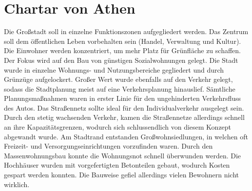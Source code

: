 \documentclass[12pt,a4paper]{report}
\newenvironment{gblock}[1]{
    \tcolorbox[beamer,
        noparskip,breakable,
        colback=green!50!,
        colbacklower=green!75!green,
        title=#1]}
{\endtcolorbox}
\begin{document}
	\bsremovechaptertitle
	\chapter{Chartar von Athen}
	\begin{gblock}{Leitbild nach Le Corbusiers (funktionale Stadt)}
	Die Großstadt soll in einzelne Funktionszonen aufgegliedert werden.
	Das Zentrum soll dem öffentlichen Leben vorbehalten sein (Handel, Verwaltung und Kultur). Die Einwohner werden konzentriert, um mehr Platz für Grünfläche zu schaffen.
	\end{gblock}
	\vspace{1cm}
	\begin{gblock}{Die gegliederte und autogerechte Stadt}
		Der Fokus wird auf den Bau von günstigen Sozialwohnungen gelegt.
		Die Stadt wurde in einzelne Wohnungs- und Nutzungsbereiche gegliedert und durch Grünzüge aufgelockert.
		Großer Wert wurde ebenfalls auf den Verkehr gelegt, sodass die Stadtplanung meist auf eine Verkehrsplanung hinauslief.
		Sämtliche Planungsmaßnahmen waren in erster Linie für den ungehinderten Verkehrsfluss des Autos.
		Das Straßennetz sollte ideal für den Individualverkehr ausgelegt sein.
		Durch den stetig wachsenden Verkehr, kamen die Straßennetze allerdings schnell an ihre Kapazitätsgrenzen, wodurch sich schlussendlich von diesem Konzept abgewandt wurde.
	\end{gblock}
	\vspace{1cm}
	\begin{gblock}{Urbanität durch Dichte}
		Am Stadtrand entstanden Großwohnsiedlungen, in welchen oft Freizeit- und Versorgungseinrichtungen vorzufinden waren.
		Durch den Massenwohnungsbau konnte die Wohnungsnot schnell überwunden werden.
		Die Hochhäuser wurden mit vorgefertigten Betonteilen gebaut, wodurch Kosten gespart werden konnten.
		Die Bauweise gefiel allerdings vielen Bewohnern nicht wirklich.
	\end{gblock}
\end{document}
